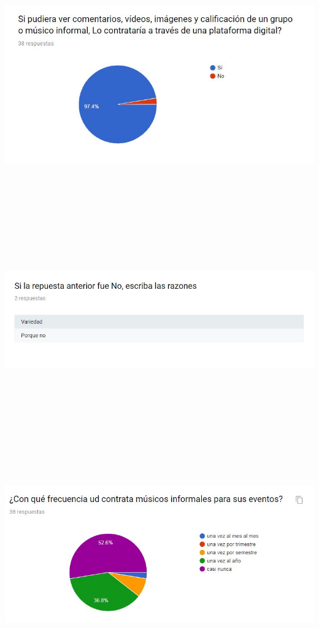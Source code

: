 \begin{center}
\includegraphics[width=16cm, height=10cm,keepaspectratio=true]{Desarrollo/RecoleccionInformacion/imgs/9.JPG}
\includegraphics[width=16cm, height=10cm,keepaspectratio=true]{Desarrollo/RecoleccionInformacion/imgs/10.JPG}
\includegraphics[width=16cm, height=10cm,keepaspectratio=true]{Desarrollo/RecoleccionInformacion/imgs/11.JPG}
\end{center}
\newpage

